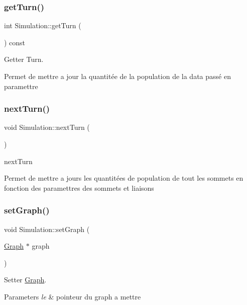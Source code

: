 \subsubsection{\texorpdfstring{get\+Turn()}{getTurn()}}
{\footnotesize\ttfamily int Simulation\+::get\+Turn (\begin{DoxyParamCaption}{ }\end{DoxyParamCaption}) const}



Getter Turn. 

Permet de mettre a jour la quantitée de la population de la data passé en paramettre \mbox{\label{class_simulation_a37a0a4dc49da67e14a09c650412d0a6e}} 
\subsubsection{\texorpdfstring{next\+Turn()}{nextTurn()}}
{\footnotesize\ttfamily void Simulation\+::next\+Turn (\begin{DoxyParamCaption}{ }\end{DoxyParamCaption})}



next\+Turn 

Permet de mettre a jours les quantitées de population de tout les sommets en fonction des paramettres des sommets et liaisons \mbox{\label{class_simulation_a72ce1eb4046e69378685ea0c46cc8448}} 
\subsubsection{\texorpdfstring{set\+Graph()}{setGraph()}}
{\footnotesize\ttfamily void Simulation\+::set\+Graph (\begin{DoxyParamCaption}\item[{\mbox{\hyperlink{class_graph}{Graph}} $\ast$}]{graph }\end{DoxyParamCaption})}



Setter \mbox{\hyperlink{class_graph}{Graph}}. 


\begin{DoxyParams}{Parameters}
{\em le} & pointeur du graph a mettre \\
\hline
\end{DoxyParams}
\mbox{\label{class_simulation_a0929f56d21b2e607e0dda8c7b9c97092}} 
